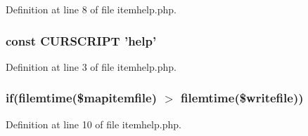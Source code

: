 Definition at line 8 of file itemhelp.\+php.

\hypertarget{itemhelp_8php_a39c39f525eceb86cabc338804f230e80}{
\subsubsection[{C\+U\+R\+S\+C\+R\+I\+P\+T}]{\setlength{\rightskip}{0pt plus 5cm}const C\+U\+R\+S\+C\+R\+I\+P\+T 'help'}}\label{itemhelp_8php_a39c39f525eceb86cabc338804f230e80}


Definition at line 3 of file itemhelp.\+php.

\hypertarget{itemhelp_8php_a46cd93534aef9d931d66996d75a1dc4f}{
\subsubsection[{if}]{\setlength{\rightskip}{0pt plus 5cm}if(filemtime(\$mapitemfile) $>$ filemtime(\$writefile))}}\label{itemhelp_8php_a46cd93534aef9d931d66996d75a1dc4f}


Definition at line 10 of file itemhelp.\+php.

